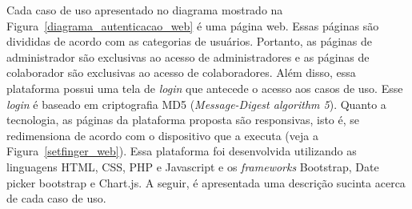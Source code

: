  Cada caso de uso apresentado no diagrama mostrado na Figura~\ref{diagrama_autenticacao_web} é uma página web. Essas páginas são divididas de acordo com as categorias de usuários. Portanto, as páginas de administrador são exclusivas ao acesso de administradores e as páginas de colaborador são exclusivas ao acesso de colaboradores. Além disso, essa plataforma possui uma tela de \textit{login} que antecede o acesso aos casos de uso. Esse \textit{login} é baseado em criptografia MD5 (\textit{Message-Digest algorithm 5}). Quanto a tecnologia, as páginas da plataforma proposta são responsivas, isto é, se redimensiona de acordo com o dispositivo que a executa (veja a Figura~\ref{setfinger_web}). Essa plataforma foi desenvolvida utilizando as linguagens HTML, CSS, PHP e Javascript e os \textit{frameworks} Bootstrap, Date picker bootstrap e Chart.js. A seguir, é apresentada uma descrição sucinta acerca de cada caso de uso.
  
